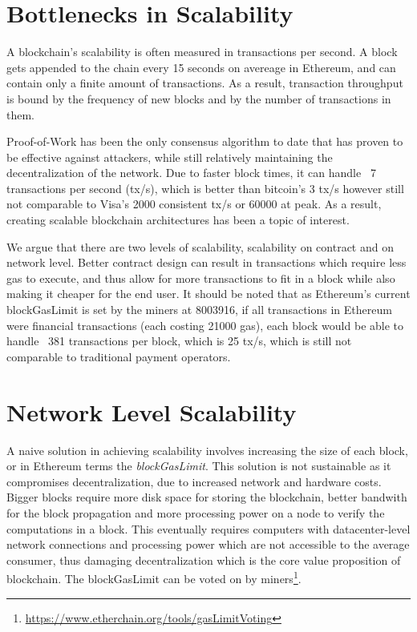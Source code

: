 \section{Bottlenecks in Scalability}
A blockchain's scalability is often measured in transactions per second. A block gets appended to the chain every 15 seconds on avereage in Ethereum, and can contain only a finite amount of transactions. As a result, transaction throughput is bound by the frequency of new blocks and by the number of transactions in them.

Proof-of-Work has been the only consensus algorithm to date that has proven to be effective against attackers, while still relatively maintaining the decentralization of the network. Due to faster block times, it can handle ~7 transactions per second (tx/s), which is better than bitcoin's 3 tx/s however still not comparable to Visa's 2000 consistent tx/s or 60000 at peak. As a result, creating scalable blockchain architectures has been a topic of interest.

We argue that there are two levels of scalability, scalability on contract and on network level. Better contract design can result in transactions which require less gas to execute, and thus allow for more transactions to fit in a block while also making it cheaper for the end user. It should be noted that as Ethereum's current blockGasLimit is set by the miners at 8003916, if all transactions in Ethereum were financial transactions (each costing 21000 gas), each block would be able to handle ~381 transactions per block, which is 25 tx/s, which is still not comparable to traditional payment operators. 

\section{Network Level Scalability}
A naive solution in achieving scalability involves increasing the size of each block, or in Ethereum terms the \textit{blockGasLimit}. This solution is not sustainable as it compromises decentralization, due to increased network and hardware costs. Bigger blocks require more disk space for storing the blockchain, better bandwith for the block propagation and more processing power on a node to verify the computations in a block. This eventually requires computers with datacenter-level network connections and processing power which are not accessible to the average consumer, thus damaging decentralization which is the core value proposition of blockchain. The blockGasLimit can be voted on by miners\footnote{\url{https://www.etherchain.org/tools/gasLimitVoting}}. %

